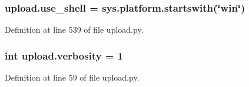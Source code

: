 \subsubsection[{\texorpdfstring{use\+\_\+shell}{use_shell}}]{\setlength{\rightskip}{0pt plus 5cm}upload.\+use\+\_\+shell = sys.\+platform.\+startswith(\char`\"{}win\char`\"{})}\hypertarget{namespaceupload_afa85ceef00a65cd276a856404eb5f310}{}\label{namespaceupload_afa85ceef00a65cd276a856404eb5f310}


Definition at line 539 of file upload.\+py.

\subsubsection[{\texorpdfstring{verbosity}{verbosity}}]{\setlength{\rightskip}{0pt plus 5cm}int upload.\+verbosity = 1}\hypertarget{namespaceupload_a79aff46409a98c4e5f608c8df1fd4612}{}\label{namespaceupload_a79aff46409a98c4e5f608c8df1fd4612}


Definition at line 59 of file upload.\+py.

